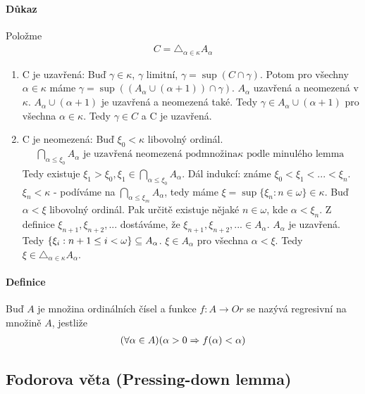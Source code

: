 \documentclass[a4paper,12pt,titlepage]{article}
\begin{document}
\paragraph{Důkaz}
Položme
\begin{align}
	C = \triangle_{\alpha \in \kappa} A_\alpha
\end{align}
\begin{enumerate}
	\item C je uzavřená: Buď $\gamma \in \kappa$, $\gamma$ limitní, $\gamma = \sup(C \cap
	\gamma)$. Potom pro všechny $\alpha \in \kappa$ máme $\gamma = \sup((A_\alpha \cup
	(\alpha+1)) \cap \gamma)$. $A_\alpha$ uzavřená a neomezená v $\kappa$. $A_\alpha
	\cup (\alpha+1)$ je uzavřená a neomezená také. Tedy $\gamma \in A_\alpha \cup
	(\alpha+1)$ pro všechna $\alpha \in \kappa$. Tedy $\gamma \in C$ a C je uzavřená.
	\item C je neomezená: Buď $\xi_0 < \kappa$ libovolný ordinál.
	\begin{align}
		\bigcap_{\alpha \le \xi_0} A_\alpha \text{ je uzavřená neomezená
		podmnožina} \kappa \text{ podle minulého lemma }
	\end{align}
	Tedy existuje $\xi_1 > \xi_0, \xi_1 \in \bigcap_{\alpha\le\xi_0} A_\alpha$.
	Dál indukcí: známe $\xi_0 < \xi_1 < ... <\xi_n$. \\
	$\xi_n < \kappa$ - podíváme na $\bigcap_{\alpha \le \xi_m}
	A_\alpha$, tedy máme $\xi = \sup \{\xi_n : n \in \omega\} \in \kappa$.
	Buď $\alpha < \xi$ libovolný ordinál. Pak určitě existuje nějaké $n \in
	\omega$, kde $\alpha < \xi_n$. Z definice $\xi_{n+1}, \xi_{n+2}, ...$
	dostáváme, že $\xi_{n+1}, \xi_{n+2}, ...  \in A_\alpha$. $A_\alpha$ je uzavřená.
	Tedy $\{ \xi_i: n+1 \le i < \omega \} \subseteq A_\alpha$. $\xi \in A_\alpha$ pro
	všechna $\alpha < \xi$. Tedy $\xi \in \triangle_{\alpha\in\kappa} A_\alpha$.
\end{enumerate}


\paragraph{Definice}
Buď $A$ je množina ordinálních čísel a funkce $f: A \to Or$ se nazývá regresivní
na množině $A$, jestliže 
\begin{align}
	(\forall \alpha \in A) (\alpha > 0 \Rightarrow f(\alpha) < \alpha)
\end{align}

\subsection{Fodorova věta (Pressing-down lemma)}
\setcounter{equation}{0}
\end{document}
